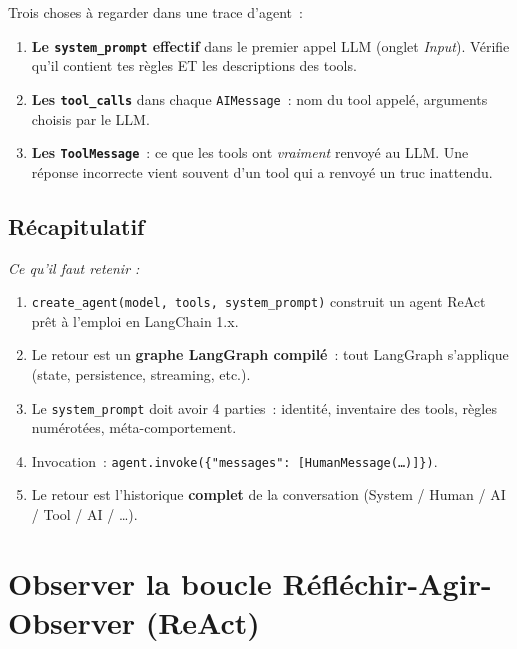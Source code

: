 \documentclass[11pt,a4paper]{article}
\begin{document}
Trois choses à regarder dans une trace d'agent~:

\begin{enumerate}[leftmargin=*]
  \item \textbf{Le \texttt{system\_prompt} effectif} dans le premier
        appel LLM (onglet \emph{Input}). Vérifie qu'il contient tes
        règles ET les descriptions des tools.
  \item \textbf{Les \texttt{tool\_calls}} dans chaque \texttt{AIMessage}~:
        nom du tool appelé, arguments choisis par le LLM.
  \item \textbf{Les \texttt{ToolMessage}}~: ce que les tools ont
        \emph{vraiment} renvoyé au LLM. Une réponse incorrecte vient
        souvent d'un tool qui a renvoyé un truc inattendu.
\end{enumerate}

\subsection*{Récapitulatif}
{\itshape\sloppy
\textit{Ce qu'il faut retenir :}
\begin{enumerate}[leftmargin=*]
  \item \texttt{create\_agent(model, tools, system\_prompt)} construit
        un agent ReAct prêt à l'emploi en LangChain 1.x.
  \item Le retour est un \textbf{graphe LangGraph compilé}~: tout
        LangGraph s'applique (state, persistence, streaming, etc.).
  \item Le \texttt{system\_prompt} doit avoir 4 parties~: identité,
        inventaire des tools, règles numérotées, méta-comportement.
  \item Invocation~:
        \texttt{agent.invoke(\{"messages": [HumanMessage(\dots)]\})}.
  \item Le retour est l'historique \textbf{complet} de la conversation
        (System / Human / AI / Tool / AI / \dots).
\end{enumerate}
\par}

\section{Observer la boucle Réfléchir-Agir-Observer (ReAct)}
\end{document}
